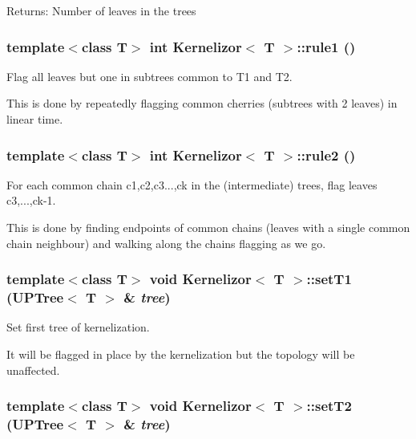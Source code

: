 \begin{Desc}
\item[Returns:]Number of leaves in the trees \end{Desc}
\subsubsection{\setlength{\rightskip}{0pt plus 5cm}template$<$class T$>$ int {\bf Kernelizor}$<$ T $>$::rule1 ()\hspace{0.3cm}{\tt  [protected]}}\label{classKernelizor_b1}


Flag all leaves but one in subtrees common to T1 and T2. 

This is done by repeatedly flagging common cherries (subtrees with 2 leaves) in linear time. 
\subsubsection{\setlength{\rightskip}{0pt plus 5cm}template$<$class T$>$ int {\bf Kernelizor}$<$ T $>$::rule2 ()\hspace{0.3cm}{\tt  [protected]}}\label{classKernelizor_b2}


For each common chain c1,c2,c3...,ck in the (intermediate) trees, flag leaves c3,...,ck-1. 

This is done by finding endpoints of common chains (leaves with a single common chain neighbour) and walking along the chains flagging as we go. 
\subsubsection{\setlength{\rightskip}{0pt plus 5cm}template$<$class T$>$ void {\bf Kernelizor}$<$ T $>$::set\-T1 ({\bf UPTree}$<$ T $>$ \& {\em tree})\hspace{0.3cm}{\tt  [inline]}}\label{classKernelizor_a2}


Set first tree of kernelization. 

It will be flagged in place by the kernelization but the topology will be unaffected. 
\subsubsection{\setlength{\rightskip}{0pt plus 5cm}template$<$class T$>$ void {\bf Kernelizor}$<$ T $>$::set\-T2 ({\bf UPTree}$<$ T $>$ \& {\em tree})\hspace{0.3cm}{\tt  [inline]}}\label{classKernelizor_a3}


